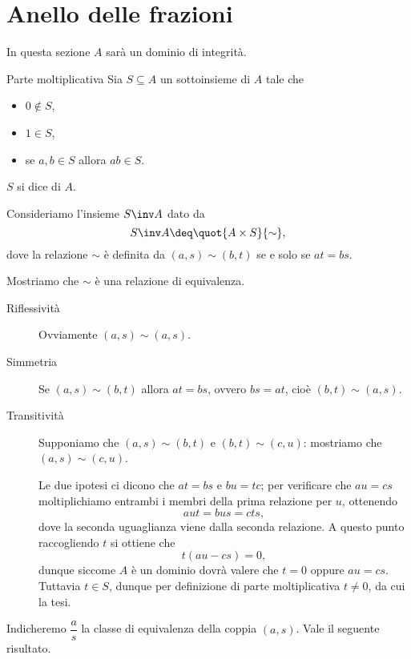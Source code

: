 \section{Anello delle frazioni}

In questa sezione $A$ sarà un dominio di integrità.

\begin{definition}
    {Parte moltiplicativa}{}
    Sia $S \subseteq A$ un sottoinsieme di $A$ tale che \begin{itemize}
        \item $0 \notin S$,
        \item $1 \in S$,
        \item se $a, b \in S$ allora $ab \in S$.
    \end{itemize}
    $S$ si dice  di $A$.
\end{definition}

Consideriamo l'insieme $S\inv A$ dato da \[
    S\inv A \deq \quot{A \times S}{\sim},    
\] dove la relazione $\sim$ è definita da $(a, s) \sim (b, t)$ se e solo se $at = bs$.

Mostriamo che $\sim$ è una relazione di equivalenza.
\begin{description}
    \item[Riflessività] Ovviamente $(a, s) \sim (a, s)$.
    \item[Simmetria] Se $(a, s) \sim (b, t)$ allora $at = bs$, ovvero $bs = at$, cioè $(b, t) \sim (a, s)$.
    \item[Transitività] Supponiamo che $(a, s) \sim (b, t)$ e $(b, t) \sim (c, u)$: mostriamo che $(a, s) \sim (c, u)$.
    
    Le due ipotesi ci dicono che $at = bs$ e $bu = tc$; per verificare che $au = cs$ moltiplichiamo entrambi i membri della prima relazione per $u$, ottenendo \[
        aut = bus = cts,
    \] dove la seconda uguaglianza viene dalla seconda relazione. A questo punto raccogliendo $t$ si ottiene che \[
        t(au - cs) = 0,    
    \] dunque siccome $A$ è un dominio dovrà valere che $t = 0$ oppure $au = cs$. Tuttavia $t \in S$, dunque per definizione di parte moltiplicativa $t \neq 0$, da cui la tesi.
\end{description}

Indicheremo $\dfrac{a}{s}$ la classe di equivalenza della coppia $(a, s)$. Vale il seguente risultato.

